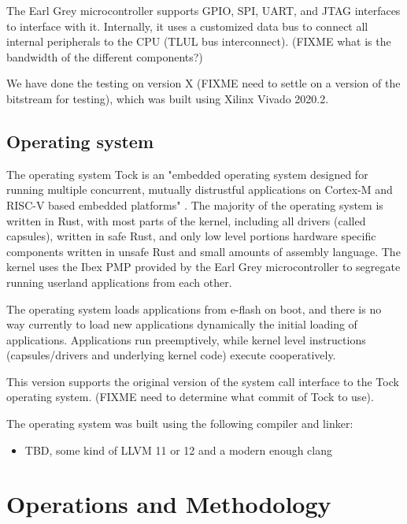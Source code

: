 \documentclass{article}
\begin{document}
The Earl Grey microcontroller supports GPIO, SPI, UART, and JTAG interfaces to interface with it. Internally, it uses a customized data bus to connect all internal peripherals to the CPU (TLUL bus interconnect). (FIXME what is the bandwidth of the different components?)

We have done the testing on version X (FIXME need to settle on a version of the bitstream for testing), which was built using Xilinx Vivado 2020.2.

\subsection{Operating system}

The operating system Tock is an "embedded operating system designed for running multiple concurrent, mutually distrustful applications on Cortex-M and RISC-V based embedded platforms" \cite{tockgithub}. The majority of the operating system is written in Rust, with most parts of the kernel, including all drivers (called capsules), written in safe Rust, and only low level portions hardware specific components written in unsafe Rust and small amounts of assembly language. The kernel uses the Ibex PMP provided by the Earl Grey microcontroller to segregate running userland applications from each other.

The operating system loads applications from e-flash on boot, and there is no way currently to load new applications dynamically the initial loading of applications. Applications run preemptively, while kernel level instructions (capsules/drivers and underlying kernel code) execute cooperatively.

This version supports the original version of the system call interface to the Tock operating system. (FIXME need to determine what commit of Tock to use).

The operating system was built using the following compiler and linker:
\begin{itemize}
    \item TBD, some kind of LLVM 11 or 12 and a modern enough clang
\end{itemize}

\section{Operations and Methodology}
\end{document}
